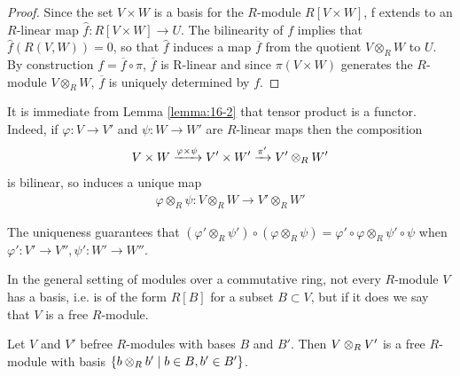\begin{proof}
  Since the set $V\times W$ is a basis for the $R$-module $R[V\times W]$, f extends
  to an $R$-linear map $\hat f: R[V\times W]\to U$. The bilinearity of $f$ implies that
  $\hat f(R(V, W)) = 0$, so that $\hat f$ induces a map $\overline{f}$ from the quotient $V\otimes_R W$ to
  $U$. By construction $f = \overline{f}\circ \pi$, $\overline{f}$ is R-linear and since $\pi(V\times W)$ 
  generates the $R$-module $V\otimes_R W$, $\overline{f}$ is uniquely determined by $f$.
\end{proof}

It is immediate from Lemma \ref{lemma:16-2} that tensor product is a functor. Indeed, if
$\varphi:V\to V'$ and $\psi:W\to W'$ are $R$-linear maps then the composition
\[
  V\times W \xra[\varphi\times\psi] V'\times W'\xra[\pi'] V'\otimes_R W'
\]
is bilinear, so induces a unique map 
\begin{align}\label{eq:16-2}
  \varphi\otimes_R\psi: V\otimes_R W\to V'\otimes_R W'
\end{align}

The uniqueness guarantees that $(\varphi'\otimes_R\psi')\circ(\varphi\otimes_R\psi) 
= \varphi'\circ\varphi\otimes_R\psi'\circ\psi$ when $\varphi':V'\to V'', \psi':W'\to W''$.

In the general setting of modules over a commutative ring, not every $R$-module
$V$ has a basis, i.e. is of the form $R[B]$ for a subset $B\subset V$, but if it does we
say that $V$ is a free $R$-module.

\begin{lemma}\label{lemma:16-3}
  Let $V$ and $V'$ befree $R$-modules with bases $B$ and $B'$. Then $V\otimes_R V'$
  is a free $R$-module with basis $\{b\otimes_R b'\mid b\in B, b'\in B'\}$.
\end{lemma}

